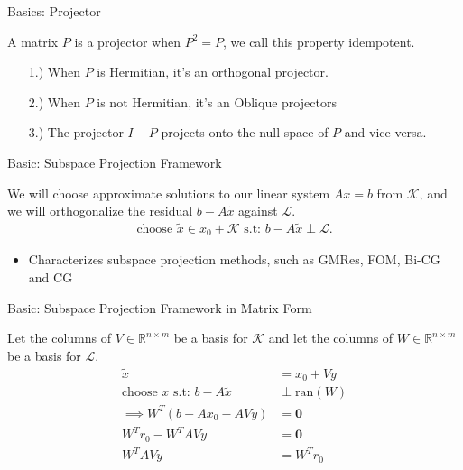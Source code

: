 \documentclass{beamer}
\begin{document}
    \begin{frame}{Basics: Projector}
        \begin{definition}[Projectors]
            A matrix $P$ is a projector when $P^2 = P$, we call this property idempotent.    
        \end{definition}
        \begin{itemize}
            \item [1.)] When $P$ is Hermitian, it's an orthogonal projector. 
            \item [2.)] When $P$ is not Hermitian, it's an Oblique projectors
            \item [3.)] The projector $I - P$ projects onto the null space of $P$ and vice versa. 
        \end{itemize}
        
    \end{frame}
    
    \begin{frame}{Basic: Subspace Projection Framework}
        \begin{definition}
            We will choose approximate solutions to our linear system $Ax=b$ from $\mathcal{K}$, and we will orthogonalize the residual $b-A \tilde{x}$ against $\mathcal{L}$.
            \begin{align}
                \text{choose }\tilde{x} \in x_0 + \mathcal{K} \text{ s.t: } b - A\tilde{x} \perp \mathcal{L}.
            \end{align}
            \begin{itemize}
                \item  Characterizes subspace projection methods, such as GMRes, FOM, Bi-CG and CG
            \end{itemize}
        \end{definition}
    \end{frame}
    
    \begin{frame}{Basic: Subspace Projection Framework in Matrix Form}
        \begin{definition}
            Let the columns of $V \in \mathbb{R}^{n \times m}$ be a basis for $\mathcal{K}$ and let the columns of $W \in \mathbb{R}^{n \times m}$ be a basis for $\mathcal{L}$. 
            \begin{align}
                \tilde{x} &= x_0 + Vy
                    \\
                    \text{choose } x \text{ s.t: } b - A\tilde{x}  &\perp \text{ran}(W)
                    \\
                    \implies W^T(b - Ax_0 - AVy) &= \mathbf{0}
                    \\
                    W^Tr_0 - W^TAVy&= \mathbf{0}
                    \\
                    W^TAVy &= W^Tr_0
            \end{align}
        \end{definition}
        
    \end{frame}
    
\end{document}
